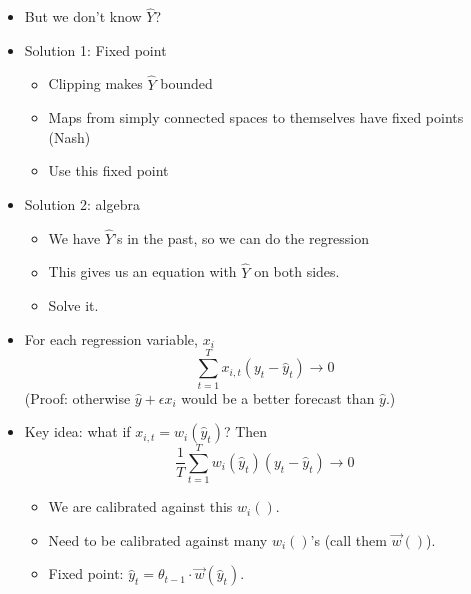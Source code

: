 \documentclass[landscape]{slides}
\begin{document}

\begin{itemize}
\item But we don't know $\hat Y$?
\item Solution 1: Fixed point
\begin{itemize}
\item Clipping makes $\hat Y$ bounded
\item Maps from simply connected spaces to themselves have fixed
points (Nash)
\item Use this fixed point
\end{itemize}
\end{itemize}


\begin{itemize}
\item Solution 2: algebra
\begin{itemize}
\item We have $\hat Y$'s in the past, so we can do the regression
\item This gives us an equation with $\hat Y$ on both sides.
\item Solve it.
\end{itemize}
\end{itemize}



\begin{itemize}
\item For each regression variable, $x_i$
\begin{displaymath}
\sum_{t=1}^T x_{i,t} (y_t - \hat{y}_t) \to 0
\end{displaymath}
(Proof: otherwise $\hat{y} + \epsilon x_{i}$
would be a better forecast than $\hat{y}$.)
\item Key idea: what if $x_{i,t} = w_i(\hat{y}_t)$?  Then
\begin{displaymath}
\frac{1}{T} \sum_{t=1}^T w_i(\hat{y}_t) (y_t - \hat{y}_t) \to 0
\end{displaymath}
\begin{itemize}
\item We are calibrated against this $w_i()$.
\item Need to be calibrated against many $w_i()$'s (call them $\vec{w}()$).
\item Fixed point: $\hat{y}_t = \theta_{t-1} \cdot \vec{w}(\hat{y}_t)$.
\end{itemize}
\end{itemize}
\end{document}
